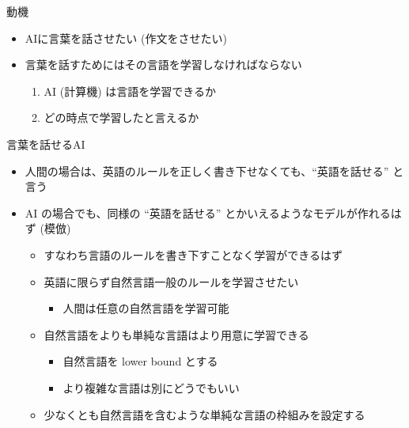\documentclass[professionalfont, 12pt, dvipdfmx, default, cjk]{beamer}
\begin{document}
\begin{frame}{動機}

\begin{itemize}
\itemsep1pt\parskip0pt
\item
  AIに言葉を話させたい (作文をさせたい)
\item
  言葉を話すためにはその言語を学習しなければならない

  \begin{enumerate}
  \def\labelenumi{\arabic{enumi}.}
  \itemsep1pt\parskip0pt
  \item
    AI (計算機) は言語を学習できるか
  \item
    どの時点で学習したと言えるか
  \end{enumerate}
\end{itemize}

\end{frame}

\begin{frame}{言葉を話せるAI}

\begin{itemize}
\itemsep1pt\parskip0pt
\item
  人間の場合は、英語のルールを正しく書き下せなくても、``英語を話せる''
  と言う
\item
  AI の場合でも、同様の ``英語を話せる''
  とかいえるようなモデルが作れるはず (模倣)

  \begin{itemize}
  \item
    すなわち言語のルールを書き下すことなく学習ができるはず \pause
  \item
    英語に限らず自然言語一般のルールを学習させたい

    \begin{itemize}
    \itemsep1pt\parskip0pt
    \item
      人間は任意の自然言語を学習可能
    \end{itemize}
  \item
    自然言語をよりも単純な言語はより用意に学習できる

    \begin{itemize}
    \itemsep1pt\parskip0pt
    \item
      自然言語を lower bound とする
    \item
      より複雑な言語は別にどうでもいい
    \end{itemize}
  \item
    少なくとも自然言語を含むような単純な言語の枠組みを設定する
  \end{itemize}
\end{itemize}

\end{frame}
\end{document}
